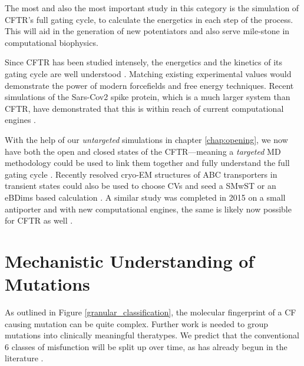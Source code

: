 
The most and also the most important study in this category is the simulation of CFTR's full gating cycle, to calculate the energetics in each step of the process. This will aid in the generation of new potentiators and also serve mile-stone in computational biophysics.

Since CFTR has been studied intensely, the energetics and the kinetics of its gating cycle are well understood \cite{csanady2017}. Matching existing experimental values would demonstrate the power of modern forcefields and free energy techniques. Recent simulations of the Sars-Cov2 spike protein, which is a much larger system than CFTR, have demonstrated that this is within reach of current computational engines \cite{casalino2021}.  

With the help of our \textit{untargeted} simulations in chapter \ref{chap:opening}, we now have both the open and closed states of the CFTR---meaning a \textit{targeted} MD methodology could be used to link them together and fully understand the full gating cycle \cite{zhang2018, liu2017}. Recently resolved cryo-EM structures of ABC transporters in transient states could also be used to choose CVs and seed a SMwST or an eBDims based calculation \cite{hofmann2019, orellana2016, roux2021, pan2008}. A similar study was completed in 2015 on a small antiporter and with new computational engines, the same is likely now possible for CFTR as well \cite{moradi2015}.


\section{Mechanistic Understanding of Mutations}
As outlined in Figure \ref{granular_classification}, the molecular fingerprint of a CF causing mutation can be quite complex. Further work is needed to group mutations into clinically meaningful theratypes. We predict that the conventional 6 classes of misfunction will be split up over time, as has already begun in the literature \cite{veit2016}. 

